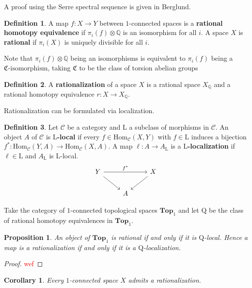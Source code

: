 \documentclass[psamsfonts]{amsart}
\newtheorem{cor}{Corollary}[section]
\newtheorem{prop}{Proposition}[section]
\theoremstyle{definition}
\newtheorem{defn}{Definition}[section]
\newcommand{\Q}{\mathbb{Q}}
\newcommand{\Top}{\mathbf{Top}}
\newcommand{\Hom}{\mathrm{Hom}}
\numberwithin{equation}{section}
\begin{document}
A proof using the Serre spectral sequence is given in Berglund\cite{Berglund}.

\begin{defn}
A map $f:X\to Y$ between $1$-connected spaces is a \textbf{rational homotopy equivalence} if $\pi_i(f)\otimes\Q$ is an isomorphism for all $i$. A space $X$ is \textbf{rational} if $\pi_i(X)$ is uniquely divisible for all $i$.
\end{defn}

Note that $\pi_i(f)\otimes\Q$ being an isomorphisms is equivalent to $\pi_i(f)$ being a ${\mathfrak{C}\textrm{-isomorphism}}$, taking $\mathfrak{C}$ to be the class of torsion abelian groups

\begin{defn}
A \textbf{rationalization} of a space $X$ is a rational space $X_\Q$ and a rational homotopy equivalence $r:X\to X_\Q$.
\end{defn}

Rationalization can be formulated via localization.

\begin{defn}
Let $\mathcal{C}$ be a category and $\mathrm{L}$ a subclass of morphisms in $\mathcal{C}$. An object $A$ of $\mathcal{C}$ is \textbf{$\mathrm{L}$-local} if every $f\in\Hom_\mathcal{C}(X,Y)$ with $f\in\mathrm{L}$ induces a bijection $f^\ast:\Hom_\mathcal{C}(Y,A)\to\Hom_\mathcal{C}(X,A)$. A map $\ell:A\to A_\mathrm{L}$ is a \textbf{$\mathrm{L}$-localization} if $\ell\in\mathrm{L}$ and $A_\mathrm{L}$ is $\mathrm{L}$-local.
\[\begin{tikzcd}
Y\arrow[dr]\arrow[rr,"f^\ast"]&&X\arrow[dl]\\
&A
\end{tikzcd}\]
\end{defn}

Take the category of $1$-connected topological spaces $\Top_1$ and let $\mathrm{Q}$ be the class of rational homotopy equivalences in $\Top_1$.

\begin{prop}
An object of $\Top_1$ is rational if and only if it is $\mathrm{Q}$-local. Hence a map is a rationalization if and only if it is a $\mathrm{Q}$-localization.
\end{prop}
\begin{proof}
\textcolor{red}{wef}
\end{proof}

\begin{cor}
Every $1$-connected space $X$ admits a rationalization.
\end{cor}
\end{document}
